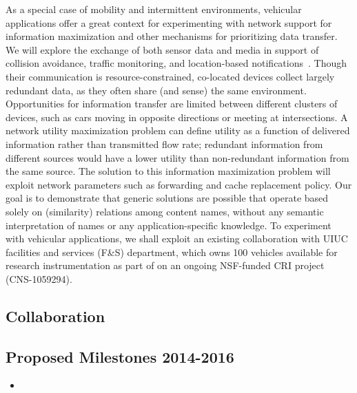 As a special case of mobility and intermittent environments, vehicular applications offer a great context for experimenting with network support for information maximization and other mechanisms for prioritizing data transfer.  
We will explore the exchange of both sensor data and media in support of collision avoidance, traffic monitoring, and location-based notifications~\cite{karagiannis2011vehicular}.  Though their communication is resource-constrained, co-located devices collect largely redundant data, as they often share (and sense) the same environment.  Opportunities for information transfer are limited between different clusters of devices, such as cars moving in opposite directions or meeting at intersections. A network utility maximization problem can define utility as a function of delivered information rather than transmitted flow rate; redundant information from different sources would have a lower utility than non-redundant information from the same source. The solution to this information maximization problem will exploit network parameters such as forwarding and cache replacement policy. Our goal is to demonstrate that generic solutions are possible that operate based solely on (similarity) relations among content names, without any semantic interpretation of names or any application-specific knowledge. 
To experiment with vehicular applications, we shall exploit an existing
collaboration with UIUC facilities and services (F\&S) department, which owns
100 vehicles available for research instrumentation as part of
on an ongoing NSF-funded CRI project (CNS-1059294).

\subsection{Collaboration}

\subsection{Proposed Milestones 2014-2016}
\begin{itemize}
\item
\end{itemize}


